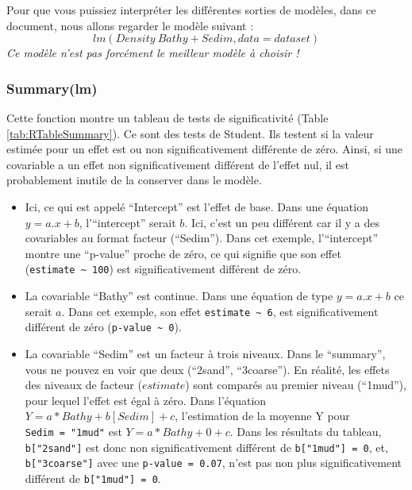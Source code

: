 \documentclass[french,a4paper]{article}
\providecommand{\tightlist}{%
  \setlength{\itemsep}{0pt}\setlength{\parskip}{0pt}}
\begin{document}
Pour que vous puissiez interpréter les différentes sorties de modèles,
dans ce document, nous allons regarder le modèle suivant :
\[lm(Density ~ Bathy + Sedim, data = dataset)\] \emph{Ce modèle n'est
pas forcément le meilleur modèle à choisir !}

\hypertarget{summarylm}{%
\subsubsection{Summary(lm)}\label{summarylm}}

Cette fonction montre un tableau de tests de significativité (Table
\ref{tab:RTableSummary}). Ce sont des tests de Student. Ils testent si
la valeur estimée pour un effet est ou non significativement différente
de zéro. Ainsi, si une covariable a un effet non significativement
différent de l'effet nul, il est probablement inutile de la conserver
dans le modèle.

\begin{itemize}
\tightlist
\item
  Ici, ce qui est appelé ``Intercept'' est l'effet de base. Dans une
  équation \(y = a.x + b\), l'``intercept'' serait \(b\). Ici, c'est un
  peu différent car il y a des covariables au format facteur
  (``Sedim''). Dans cet exemple, l'``intercept'' montre une ``p-value''
  proche de zéro, ce qui signifie que son effet
  (\texttt{estimate\ \textasciitilde{}\ 100}) est significativement
  différent de zéro.
\item
  La covariable ``Bathy'' est continue. Dans une équation de type
  \(y = a.x + b\) ce serait \(a\). Dans cet exemple, son effet
  \texttt{estimate\ \textasciitilde{}\ 6}, est significativement
  différent de zéro (\texttt{p-value\ \textasciitilde{}\ 0}).
\item
  La covariable ``Sedim'' est un facteur à trois niveaux. Dans le
  ``summary'', vous ne pouvez en voir que deux (``2sand'', ``3coarse'').
  En réalité, les effets des niveaux de facteur (\(estimate\)) sont
  comparés au premier niveau (``1mud''), pour lequel l'effet est égal à
  zéro. Dans l'équation \(Y = a*Bathy + b[Sedim] + c\), l'estimation de
  la moyenne Y pour \texttt{Sedim\ =\ "1mud"} est
  \(Y = a*Bathy + 0 + c\). Dans les résultats du tableau,
  \texttt{b{[}"2sand"{]}} est donc non significativement différent de
  \texttt{b{[}"1mud"{]}\ =\ 0}, et, \texttt{b{[}"3coarse"{]}} avec une
  \texttt{p-value\ =\ 0.07}, n'est pas non plus significativement
  différent de \texttt{b{[}"1mud"{]}\ =\ 0}.
\end{itemize}
\end{document}
